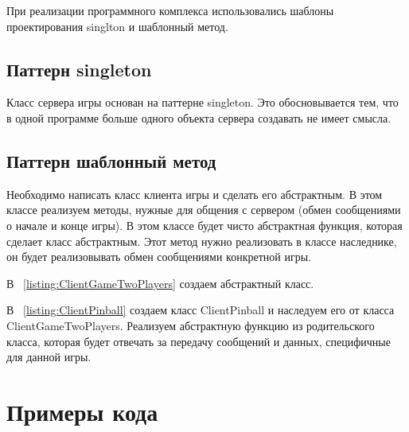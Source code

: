При реализации программного комплекса использовались шаблоны проектирования singlton и шаблонный метод.  \cite{gof}

\subsection{Паттерн singleton}

Класс сервера игры основан на паттерне singleton. Это обосновывается тем, что в одной программе больше одного объекта сервера создавать не имеет смысла.






\subsection{Паттерн шаблонный метод}

Необходимо написать класс клиента игры и сделать его абстрактным. В этом классе реализуем методы, нужные для общения с сервером (обмен сообщениями о начале и конце игры). В этом классе будет чисто абстрактная функция, которая сделает класс абстрактным. Этот метод нужно реализовать в классе наследнике, он будет реализовывать обмен сообщениями конкретной игры.

В ~\ref{listing:ClientGameTwoPlayers} создаем абстрактный класс. 

В ~\ref{listing:ClientPinball} создаем класс ClientPinball и наследуем его от класса ClientGameTwoPlayers. Реализуем абстрактную функцию из родительского класса, которая будет отвечать за передачу сообщений и данных, специфичные для данной игры.





\section{Примеры кода}

